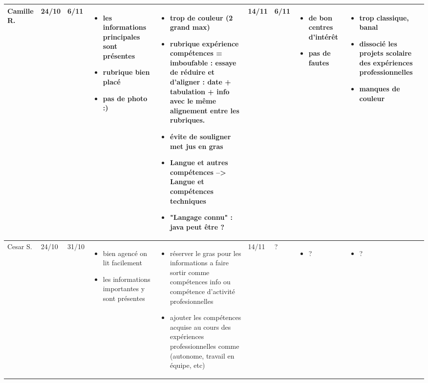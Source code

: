 \documentclass[a4paper,11pt]{article}
\begin{document}
\begin{landscape}
\begin{longtable}{|l|l|l|p{4cm}|p{4cm}|l|l|p{4cm}|p{4cm}|}
    Camille R. 	& 24/10 & 6/11
		& \begin{itemize}
		  \item les informations principales sont présentes
		  \item rubrique bien placé
		  \item pas de photo :)
		  \end{itemize}
		& \begin{itemize}
		  \item trop de couleur (2 grand max)
		  \item rubrique expérience compétences = imboufable : essaye de réduire et d'aligner : date + tabulation + info avec le même alignement entre les rubriques.
		  \item évite de souligner met jus en gras
		  \item Langue et autres compétences --> Langue et compétences techniques
		  \item "Langage  connu" : java peut être ?
		  \end{itemize}
		& 14/11 & 6/11
		& \begin{itemize}
		  \item de bon centres d'intérêt
		  \item pas de fautes
		  \end{itemize}
		& \begin{itemize}
		  \item trop classique, banal
		  \item dissocié les projets scolaire des expériences professionnelles
		  \item manques de couleur
		  \end{itemize} \\ \hline

    Cesar S.  & 24/10 & 31/10
	      & \begin{itemize}
		\item bien agencé on lit facilement
		\item les informations importantes y sont présentes
		\end{itemize}
	      & \begin{itemize}
		\item réserver le gras pour les informations a faire sortir comme compétences info ou compétence d'activité profesionnelles
		\item ajouter les compétences acquise au cours des expériences professionnelles comme (autonome, travail en équipe, etc)
		\end{itemize}
	      & 14/11 & ?
	      & \begin{itemize}
		\item ?
		\end{itemize}
	      & \begin{itemize}
		\item ?
		\end{itemize} \\ \hline


\end{longtable}
\end{landscape}
\end{document}
